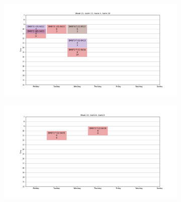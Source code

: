 \documentclass{article}
\begin{document}
\begin{figure}
\begin{subfigure}{.85\textwidth}
        \end{subfigure}
        \hspace*{-5cm}
        \begin{subfigure}{.85\textwidth}
            \centering
            \includegraphics[width=1.1\linewidth]{../images/week-21.png}
        \end{subfigure}%
        \begin{subfigure}{.85\textwidth}
            \centering
            \includegraphics[width=1.1\linewidth]{../images/week-22.png}
        \end{subfigure}
    \end{figure}

    \clearpage
\end{document}
